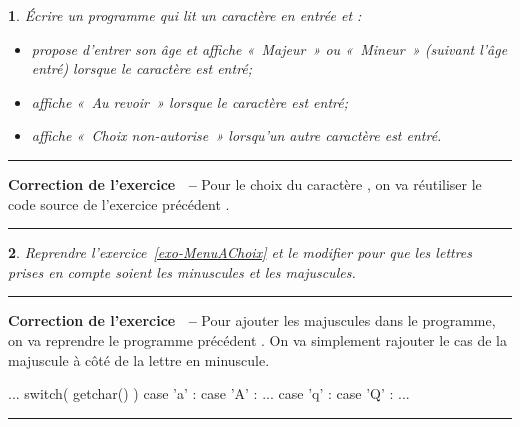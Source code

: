\documentclass[a4paper]{article}
\newenvironment{Correction}{\par\tiny\blue\rule[1ex]{\textwidth}{1pt}\par\normalsize\textbf{\sffamily{}Correction de l'exercice~\theExo{} -- }}{\par\tiny\blue\rule[1ex]{\textwidth}{1pt}\par}
\newtheorem{Exo}{{\sffamily{Exercice}}}
\begin{document}
		\begin{Exo}\label{exo-MenuAChoix}
			Écrire un programme qui lit un caractère en entrée et :
			\begin{itemize}
				\item propose d'entrer son âge et affiche «~\emph{Majeur}~» ou «~\emph{Mineur}~» (suivant l'âge entré) lorsque le caractère  est entré;
				\item affiche «~\emph{Au revoir}~» lorsque le caractère  est entré;
				\item affiche «~\emph{Choix non-autorise}~» lorsqu'un autre caractère est entré.
			\end{itemize}
		\end{Exo}
		\begin{Correction}
			Pour le choix du caractère , on va réutiliser le code source de l'exercice précédent .
		\end{Correction}
		\begin{Exo}
			Reprendre l'exercice~\vref{exo-MenuAChoix} et le modifier pour que les lettres prises en compte soient les minuscules et les majuscules.
		\end{Exo}
		\begin{Correction}
			Pour ajouter les majuscules dans le programme, on va reprendre le programme précédent .
			On va simplement rajouter le cas de la majuscule à côté de la lettre en minuscule.
			\begin{Code*}
	...
	switch( getchar() )
	{
		case 'a' :
		case 'A' :
		{
			...
		}
		case 'q' :
		case 'Q' :
		{
			...
		}
	}
			\end{Code*}
		\end{Correction}
\end{document}
